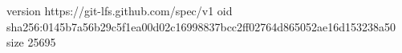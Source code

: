version https://git-lfs.github.com/spec/v1
oid sha256:0145b7a56b29c5f1ea00d02c16998837bcc2ff02764d865052ae16d153238a50
size 25695
